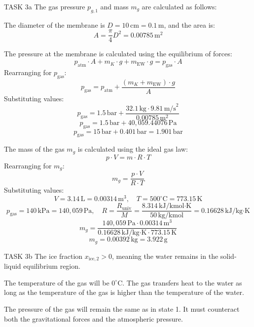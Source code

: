 TASK 3a  
The gas pressure \( p_{g,1} \) and mass \( m_g \) are calculated as follows:  

The diameter of the membrane is \( D = 10 \, \text{cm} = 0.1 \, \text{m} \), and the area is:  
\[
A = \frac{\pi}{4} D^2 = 0.00785 \, \text{m}^2
\]  

The pressure at the membrane is calculated using the equilibrium of forces:  
\[
p_{\text{atm}} \cdot A + m_K \cdot g + m_{\text{EW}} \cdot g = p_{\text{gas}} \cdot A
\]  
Rearranging for \( p_{\text{gas}} \):  
\[
p_{\text{gas}} = p_{\text{atm}} + \frac{(m_K + m_{\text{EW}}) \cdot g}{A}
\]  
Substituting values:  
\[
p_{\text{gas}} = 1.5 \, \text{bar} + \frac{32.1 \, \text{kg} \cdot 9.81 \, \text{m/s}^2}{0.00785 \, \text{m}^2}
\]  
\[
p_{\text{gas}} = 1.5 \, \text{bar} + 40,059.44076 \, \text{Pa}
\]  
\[
p_{\text{gas}} = 15 \, \text{bar} + 0.401 \, \text{bar} = 1.901 \, \text{bar}
\]  

The mass of the gas \( m_g \) is calculated using the ideal gas law:  
\[
p \cdot V = m \cdot R \cdot T
\]  
Rearranging for \( m_g \):  
\[
m_g = \frac{p \cdot V}{R \cdot T}
\]  
Substituting values:  
\[
V = 3.14 \, \text{L} = 0.00314 \, \text{m}^3, \quad T = 500^\circ\text{C} = 773.15 \, \text{K}
\]  
\[
p_{\text{gas}} = 140 \, \text{kPa} = 140,059 \, \text{Pa}, \quad R = \frac{R_{\text{univ}}}{M} = \frac{8.314 \, \text{kJ/kmol·K}}{50 \, \text{kg/kmol}} = 0.16628 \, \text{kJ/kg·K}
\]  
\[
m_g = \frac{140,059 \, \text{Pa} \cdot 0.00314 \, \text{m}^3}{0.16628 \, \text{kJ/kg·K} \cdot 773.15 \, \text{K}}
\]  
\[
m_g = 0.00392 \, \text{kg} = 3.922 \, \text{g}
\]  

TASK 3b  
The ice fraction \( x_{\text{ice},2} > 0 \), meaning the water remains in the solid-liquid equilibrium region.  

The temperature of the gas will be \( 0^\circ\text{C} \). The gas transfers heat to the water as long as the temperature of the gas is higher than the temperature of the water.  

The pressure of the gas will remain the same as in state 1. It must counteract both the gravitational forces and the atmospheric pressure.